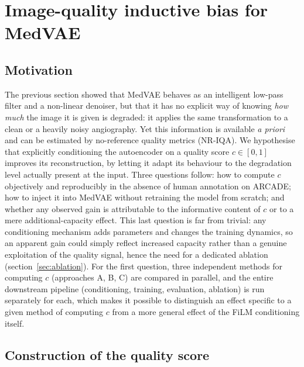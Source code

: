 \documentclass[conference]{IEEEtran}
\begin{document}
\pagestyle{plain}

\section{Image-quality inductive bias for MedVAE}
\label{sec:theophile}

\subsection{Motivation}

The previous section showed that MedVAE behaves as an intelligent low-pass
filter and a non-linear denoiser, but that it has no explicit way of
knowing \emph{how much} the image it is given is degraded: it applies the
same transformation to a clean or a heavily noisy angiography. Yet this
information is available \emph{a priori} and can be estimated by
no-reference quality metrics (NR-IQA). We hypothesise that explicitly
conditioning the autoencoder on a quality score $c \in [0,1]$ improves its
reconstruction, by letting it adapt its behaviour to the degradation level
actually present at the input. Three questions follow: how to compute $c$
objectively and reproducibly in the absence of human annotation on
ARCADE; how to inject it into MedVAE without retraining the model from
scratch; and whether any observed gain is attributable to the informative
content of $c$ or to a mere additional-capacity effect. This last
question is far from trivial: any conditioning mechanism adds parameters
and changes the training dynamics, so an apparent gain could simply
reflect increased capacity rather than a genuine exploitation of the
quality signal, hence the need for a dedicated ablation
(section~\ref{sec:ablation}). For the first question, three independent
methods for computing $c$ (approaches A, B, C) are compared in parallel,
and the entire downstream pipeline (conditioning, training, evaluation,
ablation) is run separately for each, which makes it possible to
distinguish an effect specific to a given method of computing $c$ from a
more general effect of the FiLM conditioning itself.

\subsection{Construction of the quality score}
\label{sec:score}
\end{document}
